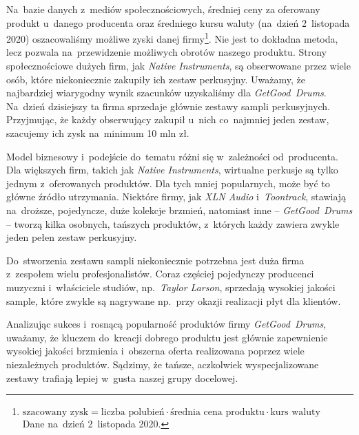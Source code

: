 \documentclass[12pt]{article}
\begin{document}
Na~bazie danych z~mediów społecznościowych, średniej ceny za oferowany produkt u~danego producenta oraz średniego kursu waluty (na~dzień 2~listopada 2020) oszacowaliśmy możliwe zyski danej firmy\footnote{$\text{szacowany zysk} = \text{liczba polubień} \cdot \text{średnia cena produktu} \cdot \text{kurs waluty}$ \\ Dane na~dzień 2~listopada 2020.\label{footnote:income}}.
Nie jest to dokładna metoda, lecz pozwala na~przewidzenie możliwych obrotów naszego produktu.
Strony społecznościowe dużych firm, jak \textit{Native Instruments}, są obserwowane przez wiele osób, które niekoniecznie zakupiły ich zestaw perkusyjny.
Uważamy, że najbardziej wiarygodny wynik szacunków uzyskaliśmy dla \textit{GetGood~Drums}.
Na~dzień dzisiejszy ta firma sprzedaje głównie zestawy sampli perkusyjnych.
Przyjmując, że każdy obserwujący zakupił u~nich co~najmniej jeden zestaw, szacujemy ich zysk na~minimum 10 mln zł.

Model biznesowy i~podejście do~tematu różni się w~zależności od~producenta.
Dla większych firm, takich jak \textit{Native Instruments}, wirtualne perkusje są tylko jednym z~oferowanych produktów.
Dla tych mniej popularnych, może być to główne źródło utrzymania.
Niektóre firmy, jak \textit{XLN Audio} i~\textit{Toontrack}, stawiają na~droższe, pojedyncze, duże kolekcje brzmień, natomiast inne -- \textit{GetGood~Drums} -- tworzą kilka osobnych, tańszych produktów, z~których każdy zawiera zwykle jeden pełen zestaw perkusyjny.

Do~stworzenia zestawu sampli niekoniecznie potrzebna jest duża firma z~zespołem wielu profesjonalistów.
Coraz częściej pojedynczy producenci muzyczni i~właściciele studiów, np.~\textit{Taylor Larson}, sprzedają wysokiej jakości sample, które zwykle są nagrywane np.~przy okazji realizacji płyt dla klientów.

Analizując sukces i~rosnącą popularność produktów firmy \textit{GetGood~Drums}, uważamy, że kluczem do~kreacji dobrego produktu jest głównie zapewnienie wysokiej jakości brzmienia i~obszerna oferta realizowana poprzez wiele niezależnych produktów. Sądzimy, że tańsze, aczkolwiek wyspecjalizowane zestawy trafiają lepiej w~gusta naszej grupy docelowej.
\end{document}
